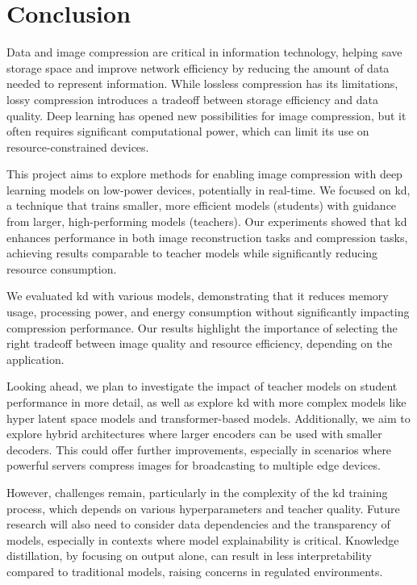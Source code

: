 \chapter*{Conclusion}
Data and image compression are critical in information technology, helping save storage space and improve network efficiency by reducing the amount of data needed to represent information. While lossless compression has its limitations, lossy compression introduces a tradeoff between storage efficiency and data quality. Deep learning has opened new possibilities for image compression, but it often requires significant computational power, which can limit its use on resource-constrained devices.

This project aims to explore methods for enabling image compression with deep learning models on low-power devices, potentially in real-time. We focused on \acrfull{kd}, a technique that trains smaller, more efficient models (students) with guidance from larger, high-performing models (teachers). Our experiments showed that \acrshort{kd} enhances performance in both image reconstruction tasks and compression tasks, achieving results comparable to teacher models while significantly reducing resource consumption.

We evaluated \acrshort{kd} with various models, demonstrating that it reduces memory usage, processing power, and energy consumption without significantly impacting compression performance. Our results highlight the importance of selecting the right tradeoff between image quality and resource efficiency, depending on the application.

Looking ahead, we plan to investigate the impact of teacher models on student performance in more detail, as well as explore \acrshort{kd} with more complex models like hyper latent space models and transformer-based models. Additionally, we aim to explore hybrid architectures where larger encoders can be used with smaller decoders. This could offer further improvements, especially in scenarios where powerful servers compress images for broadcasting to multiple edge devices.

However, challenges remain, particularly in the complexity of the \acrshort{kd} training process, which depends on various hyperparameters and teacher quality. Future research will also need to consider data dependencies and the transparency of models, especially in contexts where model explainability is critical. Knowledge distillation, by focusing on output alone, can result in less interpretability compared to traditional models, raising concerns in regulated environments.

